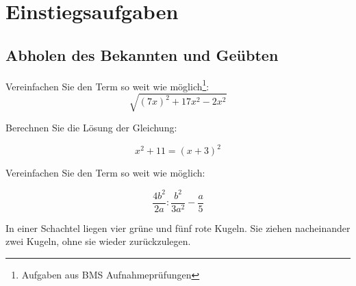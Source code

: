 
\section*{Einstiegsaufgaben}

\subsection*{Abholen des Bekannten und Geübten}



Vereinfachen Sie den Term so weit wie möglich\footnote{Aufgaben aus
    BMS Aufnahmeprüfungen}:
  $$\sqrt{(7x)^2 + 17x^2 - 2x^2}$$



Berechnen Sie die Lösung der Gleichung:

  $$x^2 + 11 = (x+3)^2$$



  Vereinfachen Sie den Term so weit wie möglich:

  $$\frac{4b^2}{2a}:\frac{b^2}{3a^2} - \frac{a}{5}$$



In einer Schachtel liegen vier grüne und fünf rote Kugeln.
Sie ziehen nacheinander zwei Kugeln, ohne sie wieder zurückzulegen.

